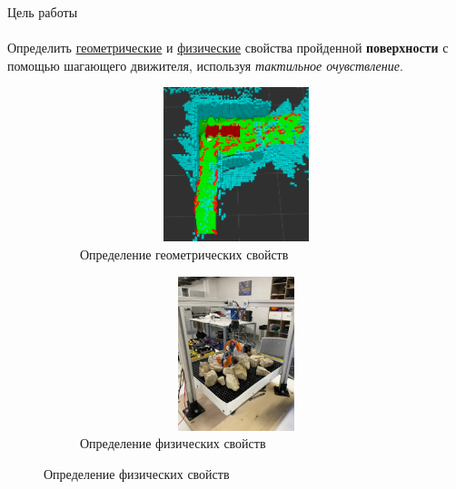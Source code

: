 \documentclass[aspectratio=169,xcolor=table]{beamer}
\begin{document}
\begin{frame}[t]{Цель работы}
\framesubtitle{}
\vspace{-0.4cm}
    Определить \underline{геометрические} и \underline{физические} свойства пройденной \textbf{поверхности} с помощью шагающего движителя, используя \textit{тактильное очувствление}.

\begin{figure}[H]
    \begin{subfigure}{0.49\textwidth}
        \centering\includegraphics[height=4.5cm,width=1\textwidth,keepaspectratio]{conv_concave.png}
        \caption*{Определение геометрических свойств}
    \end{subfigure}
    \begin{subfigure}{0.49\textwidth}
        \centering\includegraphics[height=4.5cm,width=1\textwidth,keepaspectratio]{s_shape_leg/view.jpg}
        \caption*{Определение физических свойств}
        \label{fig:s_shape_leg/view.jpg}
    \end{subfigure}
\end{figure}

\end{frame}
\end{document}
